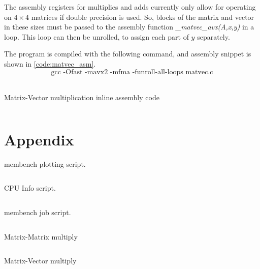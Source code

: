 \documentclass[letterpaper]{article}
\newenvironment{longlisting}{\captionsetup{type=listing}}{}
\newcommand{\code}[4]{
\begin{longlisting}
    \caption{#3}
    \inputminted[linenos]{#1}{#2}
    \label{code:#4}
\end{longlisting}
}
\begin{document}
The assembly registers for multiplies and adds currently only allow for operating on $4\times4$ matrices if double precision is used. So, blocks of the matrix and vector in these sizes must be passed to the assembly function \textit{\_matvec\_avx(A,x,y)} in a loop. This loop can then be unrolled, to assign each part of $y$ separately. 

The program is compiled with the following command, and assembly snippet is shown in \cref{code:matvec_asm}.
$$\textrm{gcc -Ofast -mavx2 -mfma -funroll-all-loops matvec.c} $$ \\


\begin{longlisting}
    \caption{Matrix-Vector multiplication inline assembly code}
    \inputminted[linenos,firstline=202,lastline=234]{c}{figures/matvec.c}
    \label{code:matvec_asm}
\end{longlisting}












\newpage
\section{Appendix}
\appendix
\begin{appendix}
\code{python}{figures/membench.py}{membench plotting script.}{membench}
\newpage
\code{bash}{figures/calc.sh}{CPU Info script.}{calc}
\newpage
\code{bash}{figures/job.slurm}{membench job script.}{job}
\newpage
\code{cpp}{figures/dgemm.cpp}{Matrix-Matrix multiply}{dgemm}
\newpage
\code{c}{figures/matvec.c}{Matrix-Vector multiply}{matvec}
\end{appendix}


\end{document}
